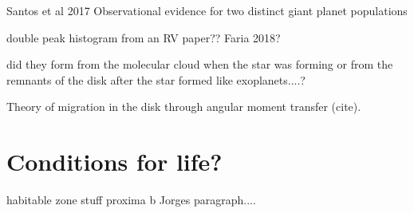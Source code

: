 \citep{santos_observational_2017} Santos et al 2017   Observational evidence for two distinct giant planet populations


double peak histogram from an {RV} paper?? Faria 2018?


did they form from the molecular cloud when the star was forming or from the remnants of the disk after the star formed like exoplanets....?


Theory of migration in the disk through  angular moment transfer (cite).


\section{Conditions for life?}
habitable zone stuff
proxima b
Jorges paragraph....
